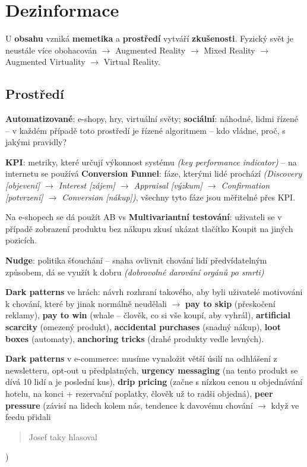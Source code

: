 \section{Dezinformace}

U \textbf{obsahu} vzniká \textbf{memetika} a \textbf{prostředí} vytváří \textbf{zkušenosti}. Fyzický svět je neustále více obohacován $\to$ Augmented Reality $\to$ Mixed Reality $\to$ Augmented Virtuality $\to$ Virtual Reality.

\subsection{Prostředí}

\textbf{Automatizované}: e-shopy, hry, virtuální světy; \textbf{sociální}: náhodné, lidmi řízené -- v každém případě toto prostředí je řízené algoritmem -- kdo vládne, proč, s jakými pravidly?

\vspace{4pt}
\noindent \textbf{KPI}: metriky, které určují výkonnost systému \textit{(key performance indicator)} -- na internetu se používá \textbf{Conversion Funnel}: fáze, kterými lidé prochází \textit{(Discovery [objevení] $\to$ Interest [zájem] $\to$ Appraisal [výzkum] $\to$ Confirmation [potvrzení] $\to$ Conversion [nákup])}, všechny tyto fáze jsou měřitelné přes KPI.

\vspace{4pt}
\noindent Na e-shopech se dá použít AB vs \textbf{Multivariantní testování}: uživateli se v případě zobrazení produktu bez nákupu zkusí ukázat tlačítko Koupit na jiných pozicích.

\vspace{4pt}
\noindent \textbf{Nudge}: politika šťouchání -- snaha ovlivnit chování lidí předvídatelným způsobem, dá se využít k dobru \textit{(dobrovolné darování orgánů po smrti)}

\vspace{4pt}
\noindent \textbf{Dark patterns} ve hrách: návrh rozhraní takového, aby byli uživatelé motivováni k chování, které by jinak normálně neudělali $\to$ \textbf{pay to skip} (přeskočení reklamy), \textbf{pay to win} (whale -- člověk, co si vše koupí, aby vyhrál), \textbf{artificial scarcity} (omezený produkt), \textbf{accidental purchases} (snadný nákup), \textbf{loot boxes} (automaty), \textbf{anchoring tricks} (drahé produkty vedle levných).

\vspace{4pt}
\noindent \textbf{Dark patterns} v e-commerce: musíme vynaložit větší úsilí na odhlášení z newsletteru, opt-out u předplatných, \textbf{urgency messaging} (na tento produkt se dívá 10 lidí a je poslední kus), \textbf{drip pricing} (začne s nízkou cenou u objednávání hotelu, na konci + rezervační poplatky, člověk už to radši objedná), \textbf{peer pressure} (závisí na lidech kolem nás, tendence k davovému chování $\to$ když ve feedu přidali \blockquote{Josef taky hlasoval}.)

